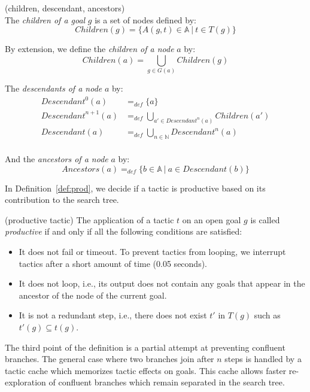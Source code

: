 \documentclass[runningheads,a4paper,draft]{svjour3}
\begin{document}
\begin{definition}\label{def:desc}(children, descendant, ancestors)\\
The \textit{children of a goal} $g$ is a set of nodes defined by:
\[\mathit{Children}(g) = \lbrace A(g,t)\in \mathbb{A}\ |\ t \in T(g) \rbrace\]

By extension, we define the \textit{children of a node} $a$ by:
\[\mathit{Children}(a) = \bigcup_{g \in G(a)} \mathit{Children}(g) \]

The \textit{descendants of a node} $a$ by:
\begin{align*}
\mathit{Descendant}^{0}(a) &=_{def} \lbrace a \rbrace \\
\mathit{Descendant}^{n+1}(a) &=_{def} \bigcup_{a' \in \mathit{Descendant}^{n}(a)}
\mathit{Children}(a') \\
\mathit{Descendant}(a) &=_{def} \bigcup_{n \in \mathbb{N}} \mathit{Descendant}^n(a)\\
\end{align*}

And the \textit{ancestors of a node} $a$ by:
\[\mathit{Ancestors}(a) =_{def} \lbrace b \in \mathbb{A} \ | \ a \in
Descendant(b) \rbrace\]
\end{definition}


In Definition~\ref{def:prod}, we decide if a tactic is productive based on its
contribution to the search tree.

\begin{definition}\label{def:prod} (productive tactic)
The application of a tactic $t$ on an open goal $g$ is called 
\textit{productive} if and only if
all the following conditions are satisfied:
\begin{itemize}
\item It does not fail or timeout. To prevent tactics from looping, we
interrupt tactics after a short amount of time (0.05 seconds).
\item It does not loop, i.e., its output does not contain any goals that appear
in the ancestor of the node of the current goal.
\item It is not a redundant step, i.e., there does not exist $t'$ in $T(g)$ 
such as $t'(g) \subseteq t(g)$.
\end{itemize}

The third point of the definition is a partial attempt at preventing confluent
branches. The general case where two branches join after $n$ steps is handled
by a tactic cache which memorizes tactic effects on goals. This
cache allows faster re-exploration of confluent branches which remain
separated in the search tree.
\end{definition}
\end{document}
